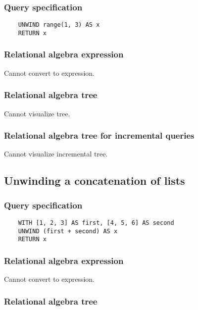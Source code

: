 	\subsubsection*{Query specification}

	\begin{lstlisting}
	UNWIND range(1, 3) AS x
	RETURN x
	\end{lstlisting}


	\subsubsection*{Relational algebra expression}

	Cannot convert to expression.

	\subsubsection*{Relational algebra tree}

	Cannot visualize tree.

	\subsubsection*{Relational algebra tree for incremental queries}

	Cannot visualize incremental tree.
	\subsection{Unwinding a concatenation of lists}

	\subsubsection*{Query specification}

	\begin{lstlisting}
	WITH [1, 2, 3] AS first, [4, 5, 6] AS second
	UNWIND (first + second) AS x
	RETURN x
	\end{lstlisting}


	\subsubsection*{Relational algebra expression}

	Cannot convert to expression.

	\subsubsection*{Relational algebra tree}


